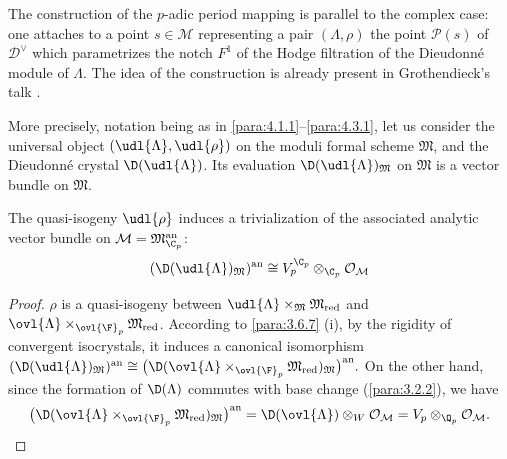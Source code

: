 \begin{para}\label{para:6.1.1} The construction of the $p$-adic period
 mapping is parallel to the complex case: one 
 attaches to a point $s\in \mathcal{M}$ representing a pair $(\Lambda,
 \rho)$ the point $\mathcal{P}(s)$ of $\mathcal{D}^\vee$ 
which parametrizes the notch $F^1$ of the Hodge filtration of the
 Dieudonn\'e module of $\Lambda$. The idea of the construction is
 already present in Grothendieck's talk
 \cite{grothendieck70:_group_barsot_tate}.
\end{para}

\begin{para}\label{para:6.1.2} More precisely, notation being as in
 \ref{para:4.1.1}--\ref{para:4.3.1}, let us consider the universal object 
 $(\udl{\Lambda},\udl{\rho})$ on the moduli formal scheme
 $\mathfrak{M}$, and the Dieudonn\'e crystal $\D(\udl{\Lambda})$. Its
 evaluation $\D(\udl{\Lambda})_{\mathfrak{M}}$ on $\mathfrak{M}$ is a
 vector bundle on $\mathfrak{M}$.
\end{para}

\begin{lem}\label{lem:6.1.3} The quasi-isogeny $\udl{\rho}$ induces a
 trivialization of the associated analytic vector bundle on
$\mathcal{M}={\mathfrak{M}}^{\mathrm{an}}_{\C_p} $:
\begin{equation*}
 (\D(\udl{\Lambda})_{\mathfrak{M}})^{\mathrm{an}}\cong
 V_p^{\C_p}\otimes_{\C_p}\mathcal{O}_\mathcal{M}
\end{equation*}


\end{lem}

\begin{proof}
 $\rho$ is a quasi-isogeny between $\udl{\Lambda}
 \times_{\mathfrak{M}}{\mathfrak{M}}_{\mathrm{red}}$ and
 $\ovl{\Lambda}\times_{\ovl{\F}_p}{\mathfrak{M}}_{\mathrm{red}}$. According to
 \ref{para:3.6.7} (i), by the rigidity of convergent isocrystals, it induces a
 canonical isomorphism $(\D(\udl{\Lambda})_{\mathfrak{M}})^{\mathrm{an}}\cong
 \bigl(\D(\ovl{\Lambda}\times_{\ovl{\F}_p}
 {\mathfrak{M}}_{\mathrm{red}})_{\mathfrak{M}}\bigr)^{\mathrm{an}}.$
 On the other hand, since the formation of $\D(\Lambda)$ commutes with
 base change (\ref{para:3.2.2}), we have
 \begin{equation*}
 \bigl(\D(\ovl{\Lambda}\times_{\ovl{\F}_p}
 {\mathfrak{M}}_{\mathrm{red}})_{\mathfrak{M}}\bigr)^{\mathrm{an}} =
 \D(\ovl{\Lambda})\otimes_W 
 \mathcal{O}_\mathcal{M}=V_p\otimes_{\Q_p}\mathcal{O}_\mathcal{M}.
 \end{equation*}
\end{proof}

